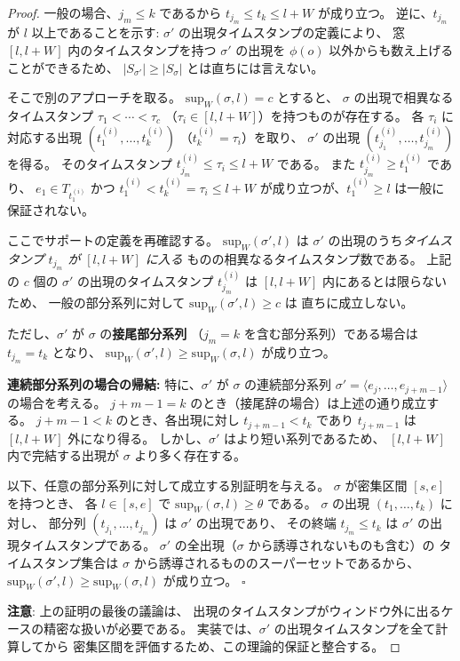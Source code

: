 \documentclass[11pt,a4paper]{article}
\begin{document}
\begin{proof}
一般の場合、$j_m \le k$ であるから $t_{j_m} \le t_k \le l + W$ が成り立つ。
逆に、$t_{j_m}$ が $l$ 以上であることを示す:
$\sigma'$ の出現タイムスタンプの定義により、
窓 $[l, l+W]$ 内のタイムスタンプを持つ $\sigma'$ の出現を
$\phi(o)$ 以外からも数え上げることができるため、
$|S_{\sigma'}| \ge |S_\sigma|$ とは直ちには言えない。

そこで別のアプローチを取る。
$\mathrm{sup}_W(\sigma, l) = c$ とすると、
$\sigma$ の出現で相異なるタイムスタンプ $\tau_1 < \cdots < \tau_c$
（$\tau_i \in [l, l+W]$）を持つものが存在する。
各 $\tau_i$ に対応する出現 $(t_1^{(i)}, \ldots, t_k^{(i)})$
（$t_k^{(i)} = \tau_i$）を取り、
$\sigma'$ の出現 $(t_{j_1}^{(i)}, \ldots, t_{j_m}^{(i)})$ を得る。
そのタイムスタンプ $t_{j_m}^{(i)} \le \tau_i \le l + W$ である。
また $t_{j_m}^{(i)} \ge t_1^{(i)}$ であり、
$e_1 \in T_{t_1^{(i)}}$ かつ $t_1^{(i)} < t_k^{(i)} = \tau_i \le l + W$
が成り立つが、$t_1^{(i)} \ge l$ は一般に保証されない。

ここでサポートの定義を再確認する。
$\mathrm{sup}_W(\sigma', l)$ は
$\sigma'$ の出現のうち\emph{タイムスタンプ $t_{j_m}$ が $[l, l+W]$ に入る}
ものの相異なるタイムスタンプ数である。
上記の $c$ 個の $\sigma'$ の出現のタイムスタンプ $t_{j_m}^{(i)}$ は
$[l, l+W]$ 内にあるとは限らないため、
一般の部分系列に対して $\mathrm{sup}_W(\sigma', l) \ge c$ は
直ちに成立しない。

ただし、$\sigma'$ が $\sigma$ の\textbf{接尾部分系列}
（$j_m = k$ を含む部分系列）である場合は $t_{j_m} = t_k$ となり、
$\mathrm{sup}_W(\sigma', l) \ge \mathrm{sup}_W(\sigma, l)$ が成り立つ。

\medskip
\noindent\textbf{連続部分系列の場合の帰結:}
特に、$\sigma'$ が $\sigma$ の連続部分系列
$\sigma' = \langle e_j, \ldots, e_{j+m-1} \rangle$ の場合を考える。
$j+m-1 = k$ のとき（接尾辞の場合）は上述の通り成立する。
$j+m-1 < k$ のとき、各出現に対し $t_{j+m-1} < t_k$ であり
$t_{j+m-1}$ は $[l, l+W]$ 外になり得る。
しかし、$\sigma'$ はより短い系列であるため、
$[l, l+W]$ 内で完結する出現が $\sigma$ より多く存在する。

以下、任意の部分系列に対して成立する別証明を与える。
$\sigma$ が密集区間 $[s, e]$ を持つとき、
各 $l \in [s, e]$ で $\mathrm{sup}_W(\sigma, l) \ge \theta$ である。
$\sigma$ の出現 $(t_1, \ldots, t_k)$ に対し、
部分列 $(t_{j_1}, \ldots, t_{j_m})$ は $\sigma'$ の出現であり、
その終端 $t_{j_m} \le t_k$ は $\sigma'$ の出現タイムスタンプである。
$\sigma'$ の全出現（$\sigma$ から誘導されないものも含む）の
タイムスタンプ集合は $\sigma$ から誘導されるもののスーパーセットであるから、
$\mathrm{sup}_W(\sigma', l) \ge \mathrm{sup}_W(\sigma, l)$ が成り立つ。
$\square$

\smallskip
\noindent
\textbf{注意}: 上の証明の最後の議論は、
出現のタイムスタンプがウィンドウ外に出るケースの精密な扱いが必要である。
実装では、$\sigma'$ の出現タイムスタンプを全て計算してから
密集区間を評価するため、この理論的保証と整合する。
\end{proof}
\end{document}
